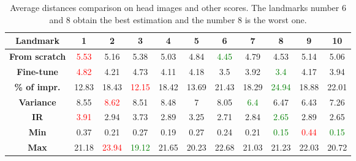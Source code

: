 \documentclass[review]{elsarticle}
\begin{document}
\begin{table}[h!]
	\centering
	\begin{tabular}{| c || c | c | c | c | c | c | c | c | c | c |}
		\hline
		\textbf{Landmark} & 1 & 2 & 3 & 4 & 5 & 6 & 7 & 8 & 9 & 10 \\ \hline \hline
		\textbf{From scratch} & \textcolor{red}{5.53} & 5.16 & 5.38 & 5.03 & 4.84 & \textcolor{green}{4.45} & 4.79 & 4.53 & 5.14 & 5.06 \\ \hline
		\textbf{Fine-tune} & \textcolor{red}{4.82} & 4.21 & 4.73 & 4.11 & 4.18 & 3.5 & 3.92 & \textcolor{green}{3.4} & 4.17 & 3.94 \\ \hline 
		\textbf{\% of impr.} & 12.83 & 18.43 & \textcolor{red}{12.15} & 18.42 & 13.69 & 21.43 & 18.29 & \textcolor{green}{24.94} & 18.88 & 22.01 \\ \hline \hline
		\textbf{Variance} & 8.55 & \textcolor{red}{8.62} & 8.51 & 8.48 & 7 & 8.05 & \textcolor{green}{6.4} & 6.47 & 6.43 & 7.26 \\ \hline
		\textbf{IR} & \textcolor{red}{3.91} & 2.94 & 3.73 & 2.89 & 3.25 & 2.71 & 2.84 & \textcolor{green}{2.65} & 2.89 & 2.65 \\ \hline
		\textbf{Min} & 0.37 & 0.21 & 0.27 & 0.19 & 0.27 & 0.24 & 0.21 & \textcolor{green}{0.15} & \textcolor{red}{0.44} & \textcolor{green}{0.15} \\ \hline
		\textbf{Max} & 21.18 & \textcolor{red}{23.94} & \textcolor{green}{19.12} & 21.65 & 20.23 & 22.68 & 21.03 & 21.23 & 22.03 & 20.72 \\ \hline

	\end{tabular}
	\caption{Average distances comparison on head images and other scores. The
          landmarks number 6 and 8 obtain the best estimation and the
          number 8 is the worst one. }
	\label{tblfn_head}
\end{table}
\end{document}
